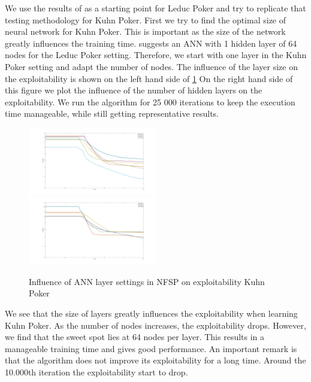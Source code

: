 \documentclass[10pt,a4paper]{article}
\begin{document}
We use the results of \cite{heinrichphd} as a starting point for Leduc Poker and try to replicate that testing methodology for Kuhn Poker.
First we try to find the optimal size of neural network for Kuhn Poker. This is important as the size of the network greatly influences the training time.
\cite{heinrichphd} suggests an ANN with 1 hidden layer of 64 nodes for the Leduc Poker setting. Therefore, we start with one layer in the Kuhn Poker setting and adapt the number of nodes. The influence of the layer size on the exploitability is shown on the left hand side of \ref{fig:layers_kuhn}
On the right hand side of this figure we plot the influence of the number of hidden layers on the exploitability. We run the algorithm for 25 000 iterations to keep the execution time manageable, while still getting representative results.

\begin{center}
\begin{figure}[h]
\label{fig:layers_kuhn}
\includegraphics[width=0.5\textwidth]{Figures/kuhn_layer_size.jpg}
\includegraphics[width=0.5\textwidth]{Figures/kuhn_layers.jpg}
\caption{Influence of ANN layer settings in NFSP on exploitability Kuhn Poker}
\end{figure}
\end{center}

We see that the size of layers greatly influences the exploitability when learning Kuhn Poker. As the number of nodes increases, the exploitability drops. However, we find that the sweet spot lies at 64 nodes per layer. This results in a manageable training time and gives good performance.
An important remark is that the algorithm does not improve its exploitability for a long time. Around the 10.000th iteration the exploitability start to drop. 
\end{document}
